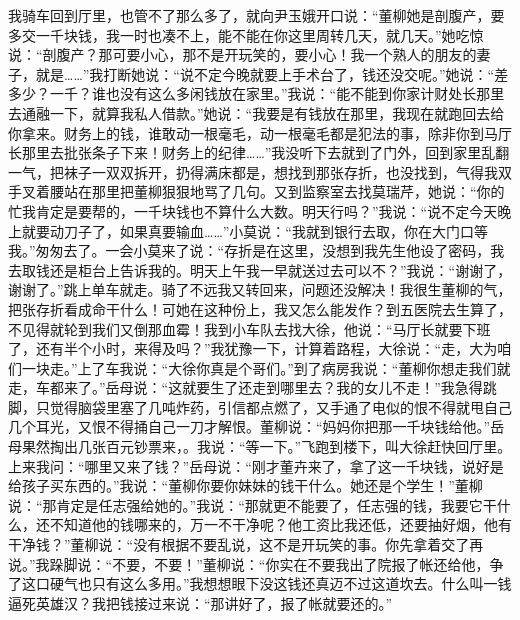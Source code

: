 \documentclass[12pt,oneside]{book}
\begin{document}
我骑车回到厅里，也管不了那么多了，就向尹玉娥开口说：``董柳她是剖腹产，要多交一千块钱，我一时也凑不上，能不能在你这里周转几天，就几天。''她吃惊说：``剖腹产？那可要小心，那不是开玩笑的，要小心！我一个熟人的朋友的妻子，就是\ldots\ldots{}''我打断她说：``说不定今晚就要上手术台了，钱还没交呢。''她说：``差多少？一千？谁也没有这么多闲钱放在家里。''我说：``能不能到你家计财处长那里去通融一下，就算我私人借款。''她说：``我要是有钱放在那里，我现在就跑回去给你拿来。财务上的钱，谁敢动一根毫毛，动一根毫毛都是犯法的事，除非你到马厅长那里去批张条子下来！财务上的纪律\ldots\ldots{}''我没听下去就到了门外，回到家里乱翻一气，把袜子一双双拆开，扔得满床都是，想找到那张存折，也没找到，气得我双手叉着腰站在那里把董柳狠狠地骂了几句。又到监察室去找莫瑞芹，她说：``你的忙我肯定是要帮的，一千块钱也不算什么大数。明天行吗？''我说：``说不定今天晚上就要动刀子了，如果真要输血\ldots\ldots{}''小莫说：``我就到银行去取，你在大门口等我。''匆匆去了。一会小莫来了说：``存折是在这里，没想到我先生他设了密码，我去取钱还是柜台上告诉我的。明天上午我一早就送过去可以不？''我说：``谢谢了，谢谢了。''跳上单车就走。骑了不远我又转回来，问题还没解决！我很生董柳的气，把张存折看成命干什么！可她在这种份上，我又怎么能发作？到五医院去生算了，不见得就轮到我们又倒那血霉！我到小车队去找大徐，他说：``马厅长就要下班了，还有半个小时，来得及吗？''我犹豫一下，计算着路程，大徐说：``走，大为咱们一块走。''上了车我说：``大徐你真是个哥们。''到了病房我说：``董柳你想走我们就走，车都来了。''岳母说：``这就要生了还走到哪里去？我的女儿不走！''我急得跳脚，只觉得脑袋里塞了几吨炸药，引信都点燃了，又手通了电似的恨不得就甩自己几个耳光，又恨不得捅自己一刀才解恨。董柳说：``妈妈你把那一千块钱给他。''岳母果然掏出几张百元钞票来，。我说：``等一下。''飞跑到楼下，叫大徐赶快回厅里。上来我问：``哪里又来了钱？''岳母说：``刚才董卉来了，拿了这一千块钱，说好是给孩子买东西的。''我说：``董柳你要你妹妹的钱干什么。她还是个学生！''董柳说：``那肯定是任志强给她的。''我说：``那就更不能要了，任志强的钱，我要它干什么，还不知道他的钱哪来的，万一不干净呢？他工资比我还低，还要抽好烟，他有干净钱？''董柳说：``没有根据不要乱说，这不是开玩笑的事。你先拿着交了再说。''我跺脚说：``不要，不要！''董柳说：``你实在不要我出了院报了帐还给他，争了这口硬气也只有这么多用。''我想想眼下没这钱还真迈不过这道坎去。什么叫一钱逼死英雄汉？我把钱接过来说：``那讲好了，报了帐就要还的。''
\end{document}

